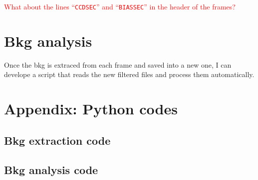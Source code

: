 \documentclass{article}
\begin{document}
\textcolor{red}{What about the lines ``\texttt{CCDSEC}'' and ``\texttt{BIASSEC}'' in the header of the frames?}


\section{Bkg analysis}
Once the bkg is extraced from each frame and saved into a new one, I can develope a script that reads the new filtered files and process them automatically.

\newpage
\section{Appendix: Python codes}
\subsection{Bkg extraction code}

\subsection{Bkg analysis code}

\end{document}
